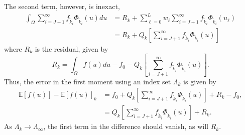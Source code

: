 \documentclass[11pt]{article}
\newcommand{\expv}[1]{\ensuremath{\mathbb{E}[ #1]}}
\begin{document}
The second term, however, is inexact,
\begin{align}
\int_\Omega \sum_{i=J+1}^\infty f_{\tilde k_i}\Phi_{\tilde k_i}(u) du &= R_k +\sum_{\ell=0}^L w_\ell \sum_{i=J+1}^\infty f_{\tilde k_i}\Phi_{\tilde k_i}(u_\ell) \\
  &= R_k + Q_k\left[\sum_{i=J+1}^\infty f_{\tilde k_i}\Phi_{\tilde k_i}(u)\right]
\end{align}
where $R_k$ is the residual, given by
\begin{equation}
R_k = \int_\Omega f(u) du - f_0 - Q_k\left[\sum_{i=J+1}^\infty f_{\tilde k_i}\Phi_{\tilde k_i}(u)\right].
\end{equation}
Thus, the error in the first moment using an index set $\Lambda_k$ is given by
\begin{align}
\expv{f(u)} -\expv{f(u)}_k &= f_0 + Q_k\left[\sum_{i=J+1}^\infty f_{\tilde k_i}\Phi_{\tilde k_i}(u)\right] + R_k - f_0,\\
  &= Q_k\left[\sum_{i=J+1}^\infty f_{\tilde k_i}\Phi_{\tilde k_i}(u)\right] + R_k.
\end{align}
As $\Lambda_k\to\Lambda_\infty$, the first term in the difference should vanish, as will $R_k$.
\end{document}

